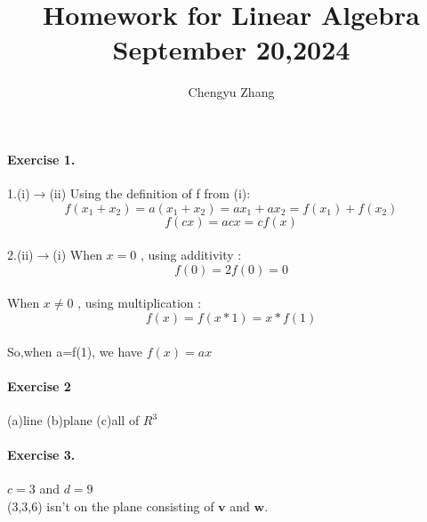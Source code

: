 \documentclass{article}
\title{\vspace{-3.5cm}Homework for Linear Algebra\\September 20,2024}
\author{Chengyu Zhang}
\date{}
\begin{document}
\maketitle
\paragraph{Exercise 1.}
1.(i)$\rightarrow$(ii) Using the definition of f from (i):
\[
f(x_1+x_2)=a(x_1+x_2)=ax_1+ax_2=f(x_1)+f(x_2)
\]
\[f(cx)=acx=cf(x)\]
\\2.(ii)$\rightarrow$(i) When $x=0$ , using additivity : \[f(0)=2f(0)=0\]\\
When $x \neq 0$ , using multiplication : \[f(x)=f(x*1)=x*f(1)\]\\
So,when a=f(1), we have $f(x)=ax$

\paragraph{Exercise 2}
(a)line (b)plane  (c)all of $R^3$  


\paragraph{Exercise 3.} $c=3$ and $d = 9$\\
(3,3,6) isn't on the plane consisting of $\boldsymbol{v}$ and $\boldsymbol{w}$.
\end{document}
